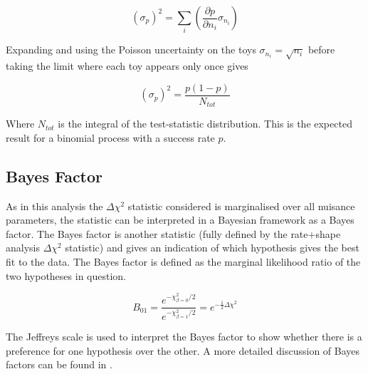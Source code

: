 \begin{equation} 
\left( \sigma_p \right)^2 = 
\sum_{i} \left( \frac{\partial p}{\partial n_i} \sigma_{n_i} \right)
\end{equation}

Expanding and using the Poisson uncertainty on the toys $\sigma_{n_i} = \sqrt{n_i}$ before taking the limit where each toy appears only once gives

\begin{equation} \label{eq:pval_error}
\left( \sigma_p \right)^2 = 
\frac{p(1-p)}{N_{tot}}
\end{equation}

Where $N_{tot}$ is the integral of the test-statistic distribution. This is the expected result for a binomial process with a success rate $p$.








\subsection{Bayes Factor} \label{sec:bayes}
As in this analysis the $\Delta \chi^2$ statistic considered is marginalised over all nuisance parameters, the statistic can be interpreted in a Bayesian framework as a Bayes factor. The Bayes factor is another statistic (fully defined by the rate+shape analysis $\Delta \chi^2$ statistic) and gives an indication of which hypothesis gives the best fit to the data. The Bayes factor is defined as the marginal likelihood ratio of the two hypotheses in question.

\begin{equation} \label{eq:bayes_factor}
B_{01} = \frac{e^{-\chi^2_{\beta = 0}/2}}{e^{-\chi^2_{\beta = 1}/2}} = e^{-\frac{1}{2}\Delta \chi^2}
\end{equation}

The Jeffreys scale \cite{JeffreysScale} is used to interpret the Bayes factor to show whether there is a preference for one hypothesis over the other. A more detailed discussion of Bayes factors can be found in \cite{MaCH3NuebarAppearance2015}.



